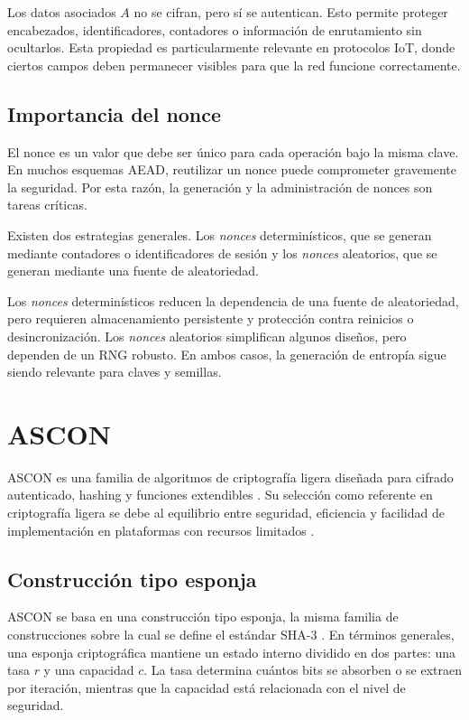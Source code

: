 Los datos asociados $A$ no se cifran, pero sí se autentican. Esto permite proteger encabezados, identificadores, contadores o información de enrutamiento sin ocultarlos. Esta propiedad es particularmente relevante en protocolos IoT, donde ciertos campos deben permanecer visibles para que la red funcione correctamente.

\subsection{Importancia del nonce}

El nonce es un valor que debe ser único para cada operación bajo la misma clave. En muchos esquemas AEAD, reutilizar un nonce puede comprometer gravemente la seguridad. Por esta razón, la generación y la administración de nonces son tareas críticas.

Existen dos estrategias generales. Los \textit{nonces} determinísticos, que se generan mediante contadores o identificadores de sesión y los \textit{nonces} aleatorios, que se generan mediante una fuente de aleatoriedad.

Los \textit{nonces} determinísticos reducen la dependencia de una fuente de aleatoriedad, pero requieren almacenamiento persistente y protección contra reinicios o desincronización. Los \textit{nonces} aleatorios simplifican algunos diseños, pero dependen de un RNG robusto. En ambos casos, la generación de entropía sigue siendo relevante para claves y semillas.

\section{ASCON}
\label{sec:ascon}

ASCON es una familia de algoritmos de criptografía ligera diseñada para cifrado autenticado, hashing y funciones extendibles \cite{Dobraunig2021AsconHashing,Dobraunig2021AsconProcess}. Su selección como referente en criptografía ligera se debe al equilibrio entre seguridad, eficiencia y facilidad de implementación en plataformas con recursos limitados \cite{Turan2025Ascon-BasedFunctions}.

\subsection{Construcción tipo esponja}

ASCON se basa en una construcción tipo esponja, la misma familia de construcciones sobre la cual se define el estándar SHA-3 \cite{Dworkin2015SHA-3Functions,Bertoni2007SpongeFunctions}. En términos generales, una esponja criptográfica mantiene un estado interno dividido en dos partes: una tasa $r$ y una capacidad $c$. La tasa determina cuántos bits se absorben o se extraen por iteración, mientras que la capacidad está relacionada con el nivel de seguridad.

